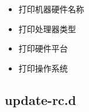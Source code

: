\documentclass[a4paper,10pt,english]{sphinxmanual}
\begin{document}
\begin{itemize}
\item {} 
打印机器硬件名称

\begin{sphinxVerbatim}[commandchars=\\\{\}]
 
\end{sphinxVerbatim}

\item {} 
打印处理器类型

\begin{sphinxVerbatim}[commandchars=\\\{\}]
 
\end{sphinxVerbatim}

\item {} 
打印硬件平台

\begin{sphinxVerbatim}[commandchars=\\\{\}]
 
\end{sphinxVerbatim}

\item {} 
打印操作系统

\begin{sphinxVerbatim}[commandchars=\\\{\}]
 
\end{sphinxVerbatim}

\end{itemize}


\subsection{update-rc.d}
\label{\detokenize{linux/shell:update-rc-d}}
\end{document}
